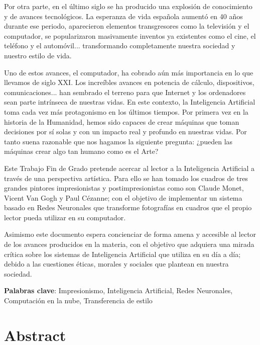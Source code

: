 \documentclass[a4paper]{report}
\newcommand{\tfg}{Trabajo Fin de Grado }
\begin{document}
Por otra parte, en el último siglo se ha producido una explosión de conocimiento y de avances tecnológicos. La esperanza de vida española aumentó en 40 años durante ese periodo, aparecieron elementos transgresores como la televisión y el computador, se popularizaron masivamente inventos ya existentes como el cine, el teléfono y el automóvil... transformando completamente nuestra sociedad y nuestro estilo de vida. \newline

Uno de estos avances, el computador, ha cobrado aún más importancia en lo que llevamos de siglo XXI. Los increíbles avances en potencia de cálculo, dispositivos, comunicaciones... han sembrado el terreno para que Internet y los ordenadores sean parte intrínseca de nuestras vidas. En este contexto, la Inteligencia Artificial toma cada vez más protagonismo en los últimos tiempos. Por primera vez en la historia de la Humanidad, hemos sido capaces de crear máquinas que toman decisiones por sí solas y con un impacto real y profundo en nuestras vidas. Por tanto suena razonable que nos hagamos la siguiente pregunta: ¿pueden las máquinas crear algo tan humano como es el Arte? \newline

Este \tfg pretende acercar al lector a la Inteligencia Artificial a través de una perspectiva artística. Para ello se han tomado los cuadros de tres grandes pintores impresionistas y postimpresionistas como son Claude Monet, Vicent Van Gogh y Paul Cézanne; con el objetivo de implementar un sistema basado en Redes Neuronales que transforme fotografías en cuadros que el propio lector pueda utilizar en su computador. \newline

Asimismo este documento espera concienciar de forma amena y accesible al lector de los avances producidos en la materia, con el objetivo que adquiera una mirada crítica sobre los sistemas de Inteligencia Artificial que utiliza en su día a día; debido a las cuestiones éticas, morales y sociales que plantean en nuestra sociedad. \newline

\textbf{Palabras clave}: Impresionismo, Inteligencia Artificial, Redes Neuronales, Computación en la nube, Transferencia de estilo


\chapter*{Abstract} %
\end{document}
